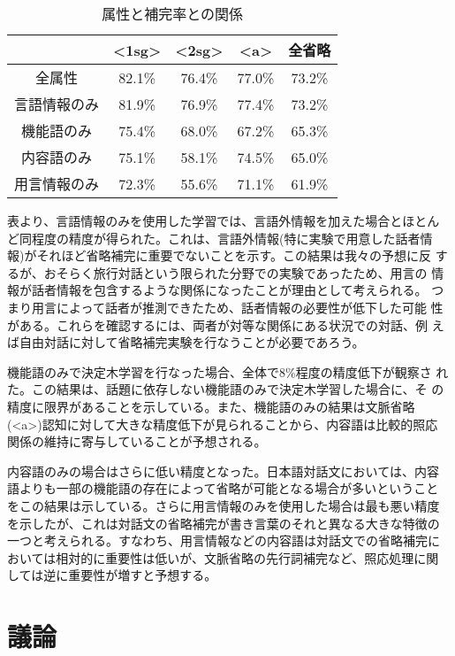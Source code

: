 \begin{table}
\begin{center}
\caption{属性と補完率との関係}
\label{結果:属性}
\begin{tabular}{c|*{4}{c}}
\hline\hline
                &<1sg>  & <2sg> &<a> \hfill & 全省略 \\
\hline
全属性          &       82.1\%& 76.4\%& 77.0\%&  73.2\%\\
\hline
言語情報のみ&   81.9\%& 76.9\%& 77.4\%&  73.2\%\\
機能語のみ  &   75.4\%& 68.0\%& 67.2\%&  65.3\%\\
内容語のみ  &   75.1\%& 58.1\%& 74.5\%&  65.0\%\\
用言情報のみ&   72.3\%& 55.6\%& 71.1\%&  61.9\%\\
\hline
\end{tabular}
\end{center}
\end{table}


表より、言語情報のみを使用した学習では、言語外情報を加えた場合とほとん
ど同程度の精度が得られた。これは、言語外情報(特に実験で用意した話者情
報)がそれほど省略補完に重要でないことを示す。この結果は我々の予想に反
するが、おそらく旅行対話という限られた分野での実験であったため、用言の
情報が話者情報を包含するような関係になったことが理由として考えられる。
つまり用言によって話者が推測できたため、話者情報の必要性が低下した可能
性がある。これらを確認するには、両者が対等な関係にある状況での対話、例
えば自由対話に対して省略補完実験を行なうことが必要であろう。

機能語のみで決定木学習を行なった場合、全体で8\%程度の精度低下が観察さ
れた。この結果は、話題に依存しない機能語のみで決定木学習した場合に、そ
の精度に限界があることを示している。また、機能語のみの結果は文脈省略
(<a>)認知に対して大きな精度低下が見られることから、内容語は比較的照応
関係の維持に寄与していることが予想される。

内容語のみの場合はさらに低い精度となった。日本語対話文においては、内容
語よりも一部の機能語の存在によって省略が可能となる場合が多いということ
をこの結果は示している。さらに用言情報のみを使用した場合は最も悪い精度
を示したが、これは対話文の省略補完が書き言葉のそれと異なる大きな特徴の
一つと考えられる。すなわち、用言情報などの内容語は対話文での省略補完に
おいては相対的に重要性は低いが、文脈省略の先行詞補完など、照応処理に関
しては逆に重要性が増すと予想する。



\section{議論}
\label{節:議論}

